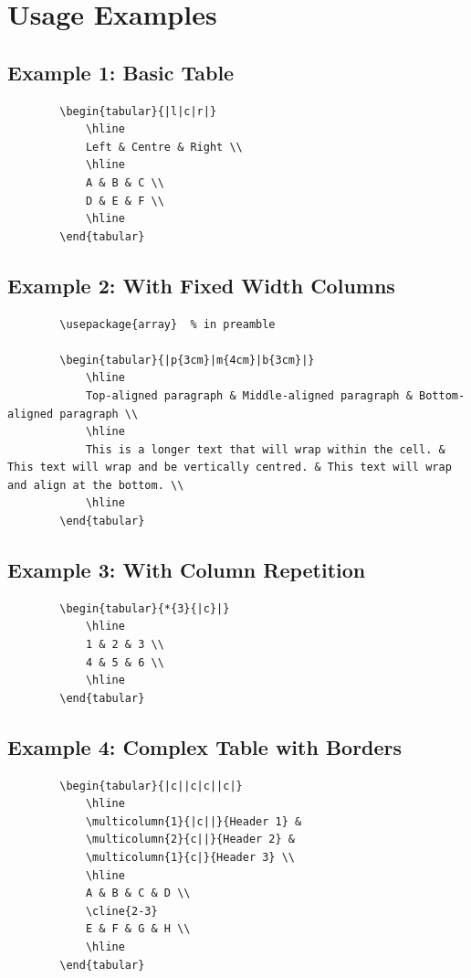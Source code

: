 \documentclass[12pt]{article}
\begin{document}
	\section{Usage Examples}
	
	\subsection*{Example 1: Basic Table}
	\begin{verbatim}
		\begin{tabular}{|l|c|r|}
			\hline
			Left & Centre & Right \\
			\hline
			A & B & C \\
			D & E & F \\
			\hline
		\end{tabular}
	\end{verbatim}
	
	\subsection*{Example 2: With Fixed Width Columns}
	\begin{verbatim}
		\usepackage{array}  % in preamble
		
		\begin{tabular}{|p{3cm}|m{4cm}|b{3cm}|}
			\hline
			Top-aligned paragraph & Middle-aligned paragraph & Bottom-aligned paragraph \\
			\hline
			This is a longer text that will wrap within the cell. & This text will wrap and be vertically centred. & This text will wrap and align at the bottom. \\
			\hline
		\end{tabular}
	\end{verbatim}
	
	\subsection*{Example 3: With Column Repetition}
	\begin{verbatim}
		\begin{tabular}{*{3}{|c}|}
			\hline
			1 & 2 & 3 \\
			4 & 5 & 6 \\
			\hline
		\end{tabular}
	\end{verbatim}
	
	\subsection*{Example 4: Complex Table with Borders}
	\begin{verbatim}
		\begin{tabular}{|c||c|c||c|}
			\hline
			\multicolumn{1}{|c||}{Header 1} & 
			\multicolumn{2}{c||}{Header 2} & 
			\multicolumn{1}{c|}{Header 3} \\
			\hline
			A & B & C & D \\
			\cline{2-3}
			E & F & G & H \\
			\hline
		\end{tabular}
	\end{verbatim}
	
\end{document}
